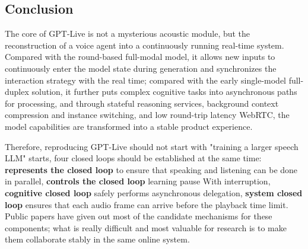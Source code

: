 \documentclass[UTF8,fontset=none,a4paper,10pt]{ctexart}
\begin{document}
\subsection{Conclusion}

The core of GPT-Live is not a mysterious acoustic module, but the reconstruction of a voice agent into a continuously running real-time system. Compared with the round-based full-modal model, it allows new inputs to continuously enter the model state during generation and synchronizes the interaction strategy with the real time; compared with the early single-model full-duplex solution, it further puts complex cognitive tasks into asynchronous paths for processing, and through stateful reasoning services, background context compression and instance switching, and low round-trip latency WebRTC, the model capabilities are transformed into a stable product experience.

Therefore, reproducing GPT-Live should not start with "training a larger speech LLM" starts, four closed loops should be established at the same time: \textbf{ represents the closed loop } to ensure that speaking and listening can be done in parallel, \textbf{ controls the closed loop } learning pause With interruption, \textbf{ cognitive closed loop } safely performs asynchronous delegation, \textbf{ system closed loop } ensures that each audio frame can arrive before the playback time limit. Public papers have given out most of the candidate mechanisms for these components; what is really difficult and most valuable for research is to make them collaborate stably in the same online system.
\end{document}

